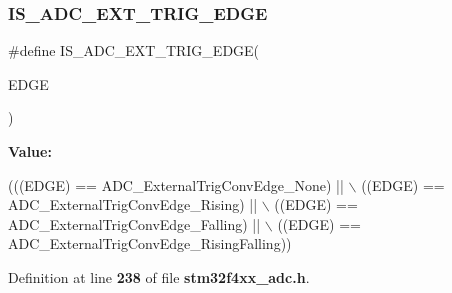 \subsubsection{I\+S\+\_\+\+A\+D\+C\+\_\+\+E\+X\+T\+\_\+\+T\+R\+I\+G\+\_\+\+E\+D\+GE}
{\footnotesize\ttfamily \#define I\+S\+\_\+\+A\+D\+C\+\_\+\+E\+X\+T\+\_\+\+T\+R\+I\+G\+\_\+\+E\+D\+GE(\begin{DoxyParamCaption}\item[{}]{E\+D\+GE }\end{DoxyParamCaption})}

{\bfseries Value\+:}
\begin{DoxyCode}
(((EDGE) == ADC_ExternalTrigConvEdge_None) || \(\backslash\)
                             ((EDGE) == ADC_ExternalTrigConvEdge_Rising) || \(\backslash\)
                             ((EDGE) == ADC_ExternalTrigConvEdge_Falling) || \(\backslash\)
                             ((EDGE) == ADC_ExternalTrigConvEdge_RisingFalling))
\end{DoxyCode}


Definition at line \textbf{ 238} of file \textbf{ stm32f4xx\+\_\+adc.\+h}.

